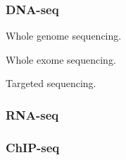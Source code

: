 
\subsubsection{DNA-seq}

Whole genome sequencing.

Whole exome sequencing.

Targeted sequencing.

\subsubsection{RNA-seq}

\subsubsection{ChIP-seq}


